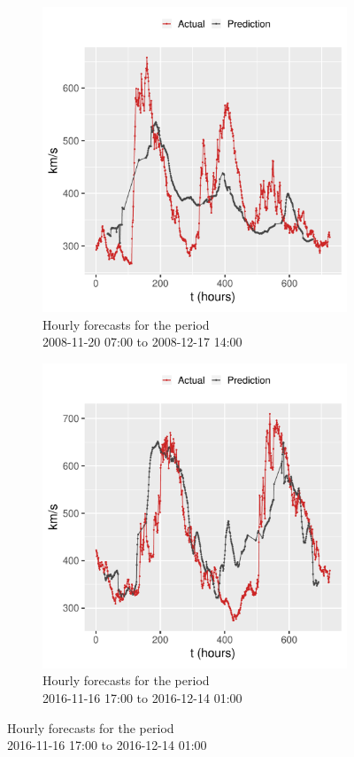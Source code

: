 \begin{figure}[!htb]
  \centering

  \begin{subfigure}[b]{0.4\textwidth}
    \centering
    \includegraphics[width=\textwidth]{figures/test_2008-11-20_2008-12-20_ts}
    \caption{Hourly forecasts for the period \\ 2008-11-20 07:00 to 2008-12-17 14:00}
    \label{fig:problemsw_ts1}
  \end{subfigure}
  \hfill
  \begin{subfigure}[b]{0.4\textwidth}
    \centering
    \includegraphics[width=\textwidth]{figures/test_2016-11-16_2016-12-17_ts}
    \caption{ Hourly forecasts for the period \\ 2016-11-16 17:00 to 2016-12-14 01:00}
    \label{fig:problemsw_ts2}
  \end{subfigure}
  

\end{figure}
